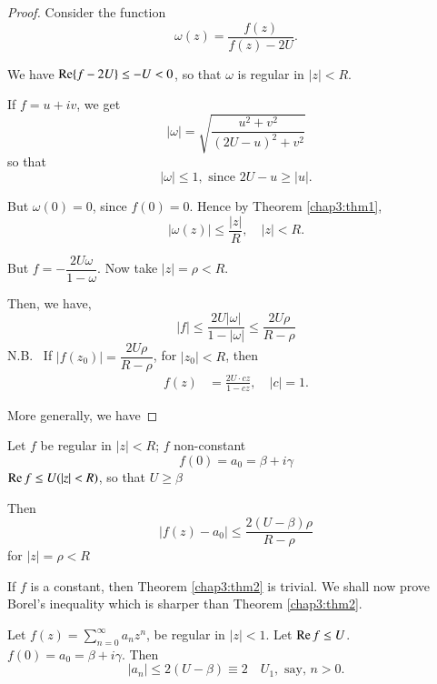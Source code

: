 \begin{proof}
Consider the function
$$
\omega (z) = \frac{f(z)}{f(z) - 2U}.
$$

We have $\operatorname{Re} \{f- 2 U\} \leq - U <0$, so that $\omega$ is regular in
$|z|<R$.

If $f=u + iv$, we get
$$
|\omega| = \sqrt{\frac{u^2 + v^2}{(2U - u)^2 + v^2}}
$$
so that
$$
|\omega| \leq 1, \text{ since } 2U - u \geq |u|.
$$

But $\omega(0) = 0$, since $f(0) = 0$. Hence by Theorem \ref{chap3:thm1}, 
$$
|\omega(z)| \leq \frac{|z|}{R}, \quad |z| < R.
$$

\eject

But $f = - \dfrac{2U\omega}{1-\omega}$. Now take $|z| = \rho <R$.



Then, we have,\pageoriginale 
$$
|f| \leq \frac{2U |\omega|}{1-|\omega|} \leq \frac{2U
  \rho}{R-\rho} 
$$
\indent
N.B.~  If  \quad $|f(z_0)| = \dfrac{2U
  \rho}{R-\rho}$, for $|z_0| < R$, then
\begin{align*}
f(z) & = \frac{2U \cdot cz}{1-cz}, \quad |c| = 1.
\end{align*}

More generally, we have
\end{proof}

\medskip
{} Let $f$ be regular in
$|z|<R$; $f$ non-constant
$$
f(0) = a_0 = \beta + i \gamma
$$
$\operatorname{Re} f \leq U (|z| < R)$, so that $U \geq \beta$

Then
$$
|f(z) - a_0| \leq \frac{2(U - \beta)\rho}{R-\rho}
$$
for $|z| = \rho < R$


\begin{remark*}
If $f$ is a constant, then Theorem \ref{chap3:thm2} is trivial.
We shall now prove Borel's inequality which is sharper than Theorem \ref{chap3:thm2}.
\end{remark*}

\begin{thm}\label{chap3:thm3}
\cite[p.114]{key12} Let $f(z) = \sum\limits^\infty_{n=0}
a_n z^n$, be regular in $|z| <1$. Let $\operatorname{Re} f \leq U$. $f(0) = a_0 =
\beta + i \gamma$.
Then
$$
|a_n| \leq 2 (U - \beta) \equiv 2 \quad U_1, \text{ say, } n >0.
$$
\end{thm}


